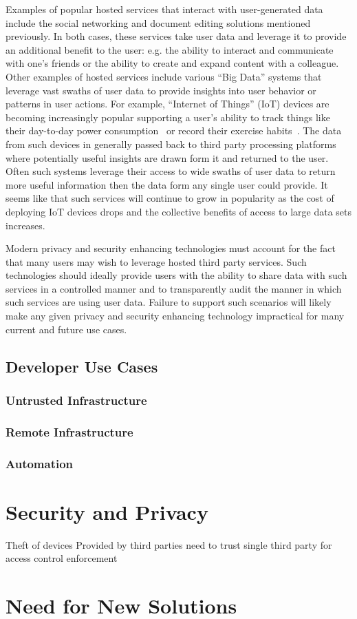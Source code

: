 Examples of popular hosted services that interact with user-generated
data include the social networking and document editing solutions
mentioned previously. In both cases, these services take user data and
leverage it to provide an additional benefit to the user: e.g. the
ability to interact and communicate with one's friends or the ability
to create and expand content with a colleague. Other examples of
hosted services include various ``Big Data'' systems that leverage
vast swaths of user data to provide insights into user behavior or
patterns in user actions. For example, ``Internet of Things'' (IoT)
devices are becoming increasingly popular supporting a user's ability
to track things like their day-to-day power consumption~\cite{neurio}
or record their exercise habits~\cite{fitbit}. The data from such
devices in generally passed back to third party processing platforms
where potentially useful insights are drawn form it and returned to
the user. Often such systems leverage their access to wide swaths of
user data to return more useful information then the data form any
single user could provide. It seems like that such services will
continue to grow in popularity as the cost of deploying IoT devices
drops and the collective benefits of access to large data sets
increases.

Modern privacy and security enhancing technologies must account for
the fact that many users may wish to leverage hosted third party
services. Such technologies should ideally provide users with the
ability to share data with such services in a controlled manner and to
transparently audit the manner in which such services are using user
data. Failure to support such scenarios will likely make any given
privacy and security enhancing technology impractical for many current
and future use cases.

\subsection{Developer Use Cases}

\subsubsection{Untrusted Infrastructure}

\subsubsection{Remote Infrastructure}

\subsubsection{Automation}

\section{Security and Privacy}

Theft of devices
Provided by third parties
need to trust single third party for access control enforcement

\section{Need for New Solutions}

